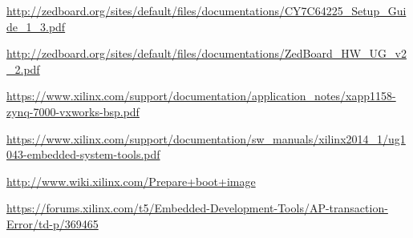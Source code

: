 \begin{itemize}
\begin{sloppypar}
\item \url{http://zedboard.org/sites/default/files/documentations/CY7C64225_Setup_Guide_1_3.pdf}
\item \url{http://zedboard.org/sites/default/files/documentations/ZedBoard_HW_UG_v2_2.pdf}
\item \url{https://www.xilinx.com/support/documentation/application_notes/xapp1158-zynq-7000-vxworks-bsp.pdf}
\item \url{https://www.xilinx.com/support/documentation/sw_manuals/xilinx2014_1/ug1043-embedded-system-tools.pdf}
\item \url{http://www.wiki.xilinx.com/Prepare+boot+image}
\item \url{https://forums.xilinx.com/t5/Embedded-Development-Tools/AP-transaction-Error/td-p/369465}
\end{sloppypar}
\end{itemize}

